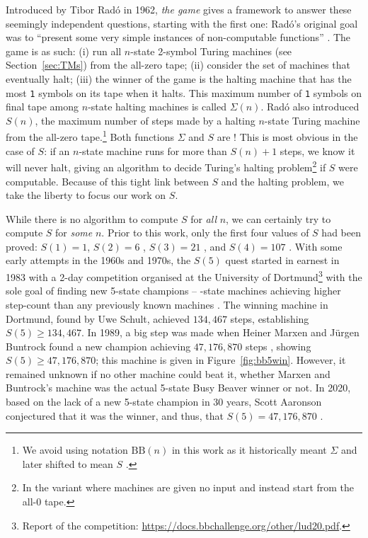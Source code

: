 \documentclass[a4paper,british]{article}
\theoremstyle{definition} %
\numberwithin{equation}{section}
\theoremstyle{definition} %
\newcommand{\sone}{\texttt{1}\xspace}
\newcommand{\BBtheFifth}{47{,}176{,}870}
\newcommand{\radofull}{Tibor Rad\'o\xspace}
\newcommand{\rado}{Rad\'o\xspace}
\begin{document}
Introduced by \radofull in 1962, \textit{the \BBfull game} gives a framework to answer these seemingly independent questions, starting with the first one: \rado's original goal was to ``present some very simple instances of non-computable functions'' \cite{Rado_1962}. The game is as such: (i) run all $n$-state 2-symbol Turing machines (see Section~\ref{sec:TMs}) from the all-zero tape; (ii) consider the set of machines that eventually halt; (iii) the winner of the game is the halting machine that has the most \sone symbols on its tape when it halts. This maximum number of \sone symbols on final tape among $n$-state halting machines is called $\Sigma(n)$. \rado also introduced $S(n)$, the maximum number of steps made by a halting $n$-state Turing machine from the all-zero tape.\footnote{We avoid using notation $\text{BB}(n)$ in this work as it historically meant $\Sigma$ \cite{Rado_1962, 10.5555/1151785.1151794} and later shifted to mean $S$ \cite{BusyBeaverFrontier,sterin_2022_14955828}.} Both functions $\Sigma$ and $S$ are \noncomput! This is most obvious in the case of $S$: if an $n$-state machine runs for more than $S(n)+1$ steps, we know it will never halt, giving an algorithm to decide Turing's halting problem\footnote{In the variant where machines are given no input and instead start from the all-0 tape.} if $S$ were computable. Because of this tight link between $S$ and the halting problem, we take the liberty to focus our work on $S$.

While there is no algorithm to compute $S$ for \textit{all} $n$, we can certainly try to compute $S$ for \textit{some} $n$. Prior to this work, only the first four values of $S$ had been proved: $S(1)=1$, $S(2)=6$ \cite{Rado_1962}, $S(3) = 21$ \cite{Lin1963}, and $S(4) = 107$ \cite{Brady83}. With some early attempts in the 1960s and 1970s, the $S(5)$ quest started in earnest in 1983 with a 2-day competition organised at the University of Dortmund\footnote{Report of the competition: \url{https://docs.bbchallenge.org/other/lud20.pdf}.} with the sole goal of finding new 5-state champions -- -state machines achieving higher step-count than any previously known machines \cite{PMichel_website,michel2019busy}. The winning machine in Dortmund, found by Uwe Schult, achieved $134{,}467$ steps, establishing $S(5) \geq 134{,}467$. In 1989, a big step was made when Heiner Marxen and J\"urgen Buntrock found a new champion achieving $\BBtheFifth$ steps \cite{Marxen_1990}, showing $S(5) \geq \BBtheFifth$; this machine is given in Figure~\ref{fig:bb5win}. However, it remained unknown if no other machine could beat it, \ie whether Marxen and Buntrock's machine was the actual 5-state Busy Beaver winner or not. In 2020, based on the lack of a new 5-state champion in 30 years, Scott Aaronson conjectured that it was the winner, and thus, that $S(5) = \BBtheFifth$ \cite{BusyBeaverFrontier}.
\end{document}
